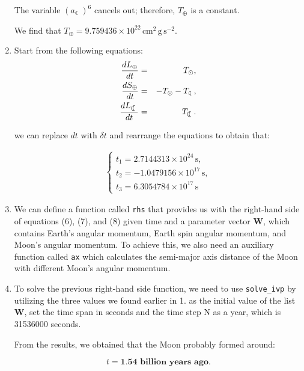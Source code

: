 \documentclass[12pt, letterpaper] {article}
\begin{document}
\begin{enumerate}
    The variable $(a_{\leftmoon})^6$ cancels out; therefore, $T_{\oplus}$ is a constant. 
    
    We find that $T_{\oplus} = 9.759436 \times 10^{22} \, \text{cm}^2 \, \text{g} \, \text{s}^{-2}$.
    
    \clearpage

    \item Start from the following equations:
    \begin{eqnarray}
        \frac{dL_\oplus}{dt} &=& T_\odot,\\
        \frac{dS_\oplus}{dt} &=& -T_\odot-T_{\text{\leftmoon}},\\
        \frac{dL_{\leftmoon}}{dt} &=& T_{\leftmoon}.
    \end{eqnarray}
    
    we can replace \(dt\) with \(\delta t\) and rearrange the equations to obtain that:

    \begin{eqnarray}
        \begin{cases}
            t_{\text{1}} = 2.7144313\times 10^{24} \, \text{s},\\
            t_{\text{2}} = -1.0479156 \times 10^{17} \, \text{s},\\
            t_{\text{3}} = 6.3054784\times 10^{17} \, \text{s}
        \end{cases}
    \end{eqnarray}

    
    \item We can define a function called \texttt{rhs} that provides us with the right-hand side of equations (6), (7), and (8) given time and a parameter vector $\mathbf{W}$, which contains Earth's angular momentum, Earth spin angular momentum, and Moon's angular momentum. To achieve this, we also need an auxiliary function called \texttt{ax} which calculates the semi-major axis distance of the Moon with different Moon's angular momentum.
    
    \item To solve the previous right-hand side function, we need to use \texttt{solve\_ivp} by utilizing the three values we found earlier in 1. as the initial value of the list \textbf{W}, set the time span in seconds and the time step N as a year, which is 31536000 seconds.

    From the results, we obtained that the Moon probably formed around:

    \begin{equation}
        t = \textbf{1.54 billion years ago}.
    \end{equation}
    

\end{enumerate}
\end{document}
